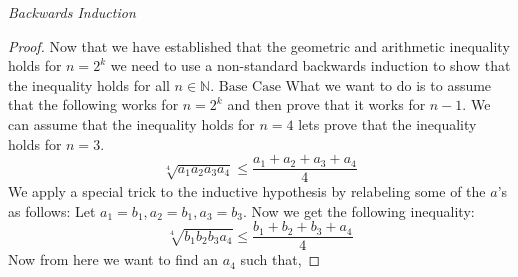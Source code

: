 \documentclass[12pt]{extreport}
\begin{document}
\begin{flushleft}
\textit{Backwards Induction}
\begin{proof}
Now that we have established that the geometric and arithmetic inequality holds for $n = 2^k$ we need to use a non-standard backwards induction to show that the inequality holds for all $n \in \mathbb{N}$.
\newline
\newline
$\boxed{\text{Base Case}}$ What we want to do is to assume that the following works for $n = 2^k$ and then prove that it works for $n - 1$. We can assume that the inequality holds for $n = 4$ lets prove that the inequality holds for $n = 3$. $$\sqrt[4]{a_1a_2a_3a_4} \leq \frac{a_1 + a_2 + a_3 + a_4}{4}$$ We apply a special trick to the inductive hypothesis by relabeling some of the $a$'s as follows: Let $a_1 = b_1, a_2 = b_1, a_3 = b_3$. Now we get the following inequality: $$\sqrt[4]{b_1b_2b_3a_4} \leq\frac{b_1 + b_2 + b_3 + a_4}{4}$$ Now from here we want to find an $a_4$ such that,


\end{proof}
\end{flushleft}
\end{document}
